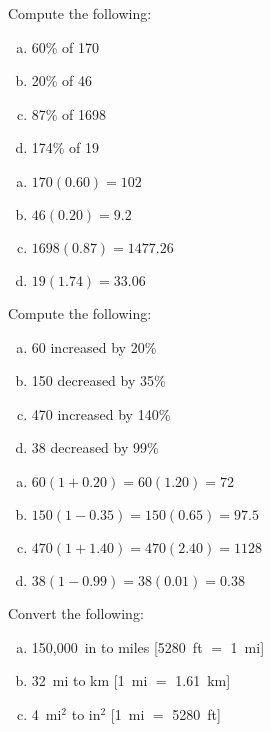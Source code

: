 \documentclass[11pt,letterpaper]{article}
\begin{document}

 Compute the following:
\begin{enumerate}[(a)]
\item 60\% of 170
\item 20\% of 46
\item 87\% of 1698
\item 174\% of 19
\end{enumerate} \pspace

\sol
{\itshape
\begin{enumerate}[(a)]
\item $170(0.60)= 102$ \pspace
\item $46(0.20)= 9.2$ \pspace
\item $1698(0.87)= 1477.26$ \pspace
\item $19(1.74)= 33.06$
\end{enumerate}
}





\newpage





 Compute the following:
\begin{enumerate}[(a)]
\item 60 increased by 20\%
\item 150 decreased by 35\%
\item 470 increased by 140\%
\item 38 decreased by 99\%
\end{enumerate} \pspace

\sol
{\itshape
\begin{enumerate}[(a)]
\item $60(1 + 0.20)= 60(1.20)= 72$ \pspace
\item $150(1 - 0.35)= 150(0.65)= 97.5$ \pspace
\item $470(1 + 1.40)= 470(2.40)= 1128$ \pspace
\item $38(1 - 0.99)= 38(0.01)= 0.38$
\end{enumerate}
}





\newpage





 Convert the following:
\begin{enumerate}[(a)]
\item 150,000~in to miles [5280~ft $=$ 1~mi]
\item 32~mi to km [1~mi $=$ 1.61~km]
\item 4~mi$^2$ to in$^2$ [1~mi $=$ 5280~ft]
\end{enumerate} \pspace
\end{document}
